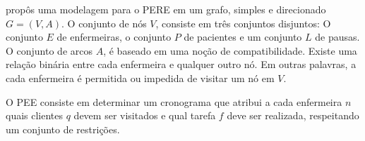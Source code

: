 \cite{cheng:98} prop\^os uma modelagem para o \ac{PERE} em um grafo, simples e direcionado $G = (V,A)$. O conjunto de nós $V$, consiste em três conjuntos disjuntos: O conjunto $E$ de enfermeiras, o conjunto $P$ de pacientes e um conjunto $L$ de pausas. O conjunto de arcos $A$, é baseado em uma noção de compatibilidade. Existe uma relação binária entre cada enfermeira e qualquer outro nó. Em outras palavras, a cada enfermeira é permitida ou impedida de visitar um nó em $V$. %



O \ac{PEE} consiste em determinar um cronograma que atribui a cada enfermeira $n$ quais clientes $q$ devem ser visitados e qual tarefa $f$ deve ser realizada, respeitando um conjunto de restrições\cite{mansini:2016}.















